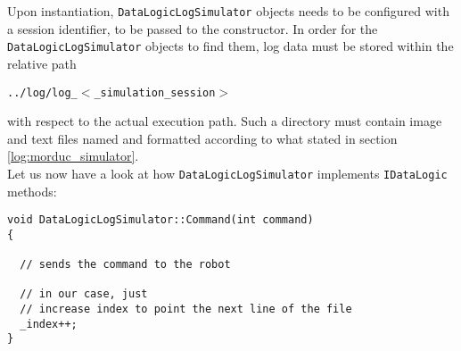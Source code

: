 Upon instantiation, \texttt{DataLogicLogSimulator} objects needs to be 
configured with a session identifier, to be passed to 
the constructor. 
In order for the \texttt{DataLogicLogSimulator} objects to find them, 
log data must be stored within the relative path 

\begin{center}
  \texttt{../log/log\_$<$\_simulation\_session$>$}
\end{center}

with respect to the actual execution path.
Such a directory must contain image and text files named and formatted
according to what stated in section \ref{log:morduc_simulator}. 
\\
Let us now have a look at how \texttt{DataLogicLogSimulator} implements 
\texttt{IDataLogic} methods:
\\
\begin{lstlisting}[caption={\texttt{DataLogicLogSimulator::Command() method}},
    label={code:datalogiclogsimulator:command}]
void DataLogicLogSimulator::Command(int command) 
{

  // sends the command to the robot

  // in our case, just 
  // increase index to point the next line of the file
  _index++;
}
\end{lstlisting}

